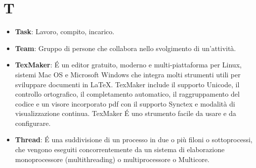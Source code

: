 \section{T}
\begin{itemize}
	\item
	\textbf{Task}: Lavoro, compito, incarico.
	\item
	\textbf{Team}: Gruppo di persone che collabora nello svolgimento di un'attività.
	\item
	\textbf{TexMaker}: É un editor gratuito, moderno e multi-piattaforma per Linux, sistemi Mac OS e Microsoft Windows che integra molti strumenti utili per sviluppare documenti in \LaTeX{}.
	TexMaker include il supporto Unicode, il controllo ortografico, il completamento automatico, il raggruppamento del codice e un visore incorporato pdf con il supporto Synctex e modalità di visualizzazione continua.
	TexMaker É uno strumento facile da usare e da configurare.
	\item
	\textbf{Thread}: É una suddivisione di un processo in due o più filoni o sottoprocessi, che vengono eseguiti concorrentemente da un sistema di elaborazione monoprocessore (multithreading) o multiprocessore o Multicore.
	
\end{itemize}
